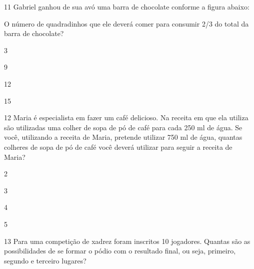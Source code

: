 \num{11} Gabriel ganhou de sua avó uma barra de chocolate conforme a figura
abaixo:


O número de quadradinhos que ele deverá comer para consumir 2/3 do total
da barra de chocolate?

\begin{escolha}
\item
  3
\item
  9
\item
  12
\item
  15
\end{escolha}


\num{12} Maria é especialista em fazer um café delicioso. Na receita em que
ela utiliza são utilizadas uma colher de sopa de pó de café para cada
250 ml de água. Se você, utilizando a receita de Maria, pretende
utilizar 750 ml de água, quantas colheres de sopa de pó de café você
deverá utilizar para seguir a receita de Maria?

\begin{escolha}
\item
  2
\item
  3
\item
  4
\item
  5
\end{escolha}


\num{13} Para uma competição de xadrez foram inscritos 10 jogadores.
Quantas são as possibilidades de se formar o pódio com o resultado
final, ou seja, primeiro, segundo e terceiro lugares?

